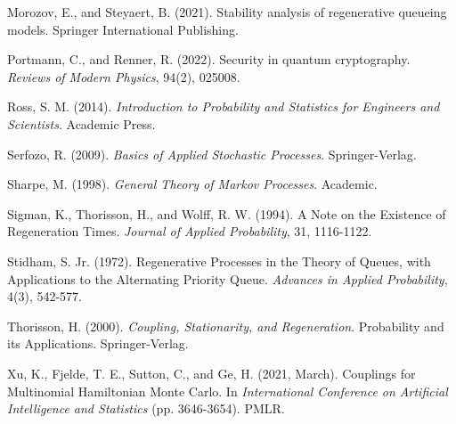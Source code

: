 \begin{thebibliography}{99}
 Morozov, E., and Steyaert, B. (2021). Stability analysis of regenerative queueing models. Springer International Publishing.

 Portmann, C., and Renner, R. (2022). Security in quantum cryptography. \textit{Reviews of Modern Physics}, 94(2), 025008.

 Ross, S. M. (2014). \textit{Introduction to Probability and Statistics for Engineers and Scientists}. Academic Press.

 Serfozo, R. (2009). \textit{Basics of Applied Stochastic Processes}. Springer-Verlag.

 Sharpe, M. (1998). \textit{General Theory of Markov Processes}. Academic.

 Sigman, K., Thorisson, H., and Wolff, R. W. (1994). A Note on the Existence of Regeneration Times. \textit{Journal of Applied Probability}, 31, 1116-1122.

 Stidham, S. Jr. (1972). Regenerative Processes in the Theory of Queues, with Applications to the Alternating Priority Queue. \textit{Advances in Applied Probability}, 4(3), 542-577.

 Thorisson, H. (2000). \textit{Coupling, Stationarity, and Regeneration}. Probability and its Applications. Springer-Verlag.

 Xu, K., Fjelde, T. E., Sutton, C., and Ge, H. (2021, March). Couplings for Multinomial Hamiltonian Monte Carlo. In \textit{International Conference on Artificial Intelligence and Statistics} (pp. 3646-3654). PMLR.

\end{thebibliography}
